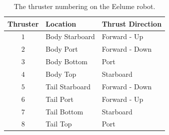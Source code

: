 \begin{table}
    \centering
    \begin{tabular}{|c|l|l|}
        \hline
        Thruster & Location & Thrust Direction \\ \hline \hline
        \(1\) & Body Starboard & Forward - Up \\ \hline
        \(2\) & Body Port & Forward - Down \\ \hline
        \(3\) & Body Bottom & Port \\ \hline
        \(4\) & Body Top & Starboard \\ \hline
        \(5\) & Tail Starboard & Forward - Down \\ \hline
        \(6\) & Tail Port & Forward - Up \\ \hline
        \(7\) & Tail Bottom & Starboard \\ \hline
        \(8\) & Tail Top & Port  \\ \hline
        \hline
    \end{tabular}
    \caption{The thruster numbering on the Eelume robot.}
    \label{tab:eelume:numbering:thrusters}
\end{table}



